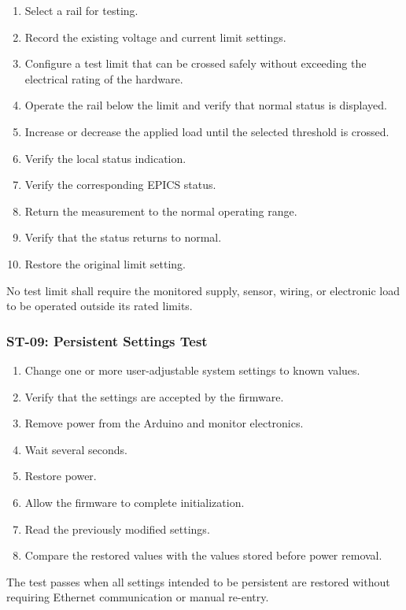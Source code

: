 \begin{enumerate}
    \item Select a rail for testing.
    \item Record the existing voltage and current limit settings.
    \item Configure a test limit that can be crossed safely without exceeding the
    electrical rating of the hardware.
    \item Operate the rail below the limit and verify that normal status is displayed.
    \item Increase or decrease the applied load until the selected threshold is crossed.
    \item Verify the local status indication.
    \item Verify the corresponding EPICS status.
    \item Return the measurement to the normal operating range.
    \item Verify that the status returns to normal.
    \item Restore the original limit setting.
\end{enumerate}

No test limit shall require the monitored supply, sensor, wiring, or electronic load
to be operated outside its rated limits.

\subsubsection{ST-09: Persistent Settings Test}

\begin{enumerate}
    \item Change one or more user-adjustable system settings to known values.
    \item Verify that the settings are accepted by the firmware.
    \item Remove power from the Arduino and monitor electronics.
    \item Wait several seconds.
    \item Restore power.
    \item Allow the firmware to complete initialization.
    \item Read the previously modified settings.
    \item Compare the restored values with the values stored before power removal.
\end{enumerate}

The test passes when all settings intended to be persistent are restored without
requiring Ethernet communication or manual re-entry.

